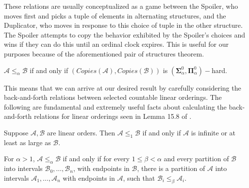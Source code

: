 \documentclass[11pt]{amsart}
\theoremstyle{definition}
\def\A{\mathcal A}
\def\B{\mathcal{B}}
\begin{document}
These relations are usually conceptualized as a game between the Spoiler, who moves first and picks a tuple of elements in alternating structures, and the Duplicator, who moves in response to this choice of tuple in the other structure.
The Spoiler attempts to copy the behavior exhibited by the Spoiler's choices and wins if they can do this until an ordinal clock expires.
This is useful for our purposes because of the aforementioned pair of structures theorem.

\begin{theorem}[\cite{AK90}]\label{thm:bfPoS}
    $\A\leq_\alpha\B$ if and only if $(Copies(\A),Copies(\B))$ is $(\mathbf{\Sigma}_\alpha^0,\mathbf{\Pi}_\alpha^0)-$hard.
\end{theorem}

This means that we can arrive at our desired result by carefully considering the back-and-forth relations between selected countable linear orderings.
The following are fundamental and extremely useful facts about calculating the back-and-forth relations for linear orderings seen in Lemma 15.8 of \cite{AK00}.

\begin{lemma}[\cite{AK00}]
Suppose $\A, \B$ are linear orders. Then $\A\leq_1 \B$ if and only if $\A$ is infinite or at least as large as $\B$. 
 
For $\alpha>1$, $\A\leq_\alpha \B$ if and only if for every $1\leq\beta<\alpha$ and every partition of $\B$ into intervals $\B_0,\dots,\B_n$, with endpoints in $\B$, there is a partition of $\A$ into intervals $\A_1,\dots,\A_n$ with endpoints in $\A$, such that $\B_i\leq_\beta \A_i$.
\end{lemma}
\end{document}
